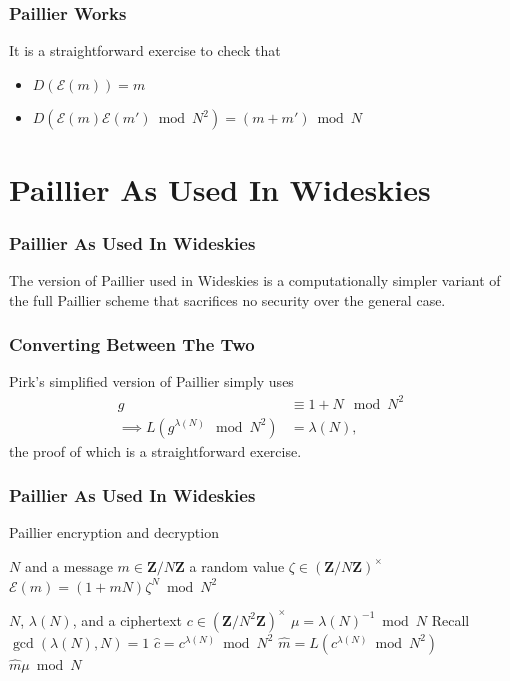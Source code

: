 \documentclass{beamer}
\makeatletter
\DeclareRobustCommand{\NAME}{Wideskies\xspace}
\newcommand{\Z}{\ensuremath{\mathbf{Z}}}
\newcommand{\zmodn}{\ensuremath{\Z/N\Z}}
\newcommand{\zmodntunits}{\ensuremath{\left(\Z/N^{2}\Z\right)^{\times}}}
\DeclareRobustCommand*{\&}{%
  \nfss@text{%
    \fontfamily{LinuxBiolinumT-TLF}%
    \selectfont
    \symbol{`\&}%
  }%
}
\makeatother
\begin{document}
\begin{frame}
\frametitle{Paillier Works}
  It is a straightforward exercise to check that 
  \begin{itemize}
    \item $D(\mathcal{E}(m)) = m$
    \item $D(\mathcal{E}(m)\mathcal{E}(m')\bmod N^2) = (m + m') \bmod N $
  \end{itemize}
\end{frame}

\section{Paillier As Used In \NAME}
\begin{frame}
\frametitle{Paillier As Used In \NAME}
The version of Paillier used in \NAME is a computationally simpler variant of the
full Paillier scheme that sacrifices no security over the general case.
\end{frame}

\begin{frame}
  \frametitle{Converting Between The Two}
  Pirk's simplified version of Paillier simply uses
  \begin{align*}
    g &\equiv 1 + N \mod N^2\\
    \implies L(g^{\lambda(N)} \mod N^2) &= \lambda(N),
  \end{align*}
  the proof of which is a straightforward exercise.
\end{frame}

\begin{frame}
\frametitle{Paillier As Used In \NAME}
\begin{algorithm}[H]
  \caption{Paillier encryption and decryption}\label{alg.paillier_encrypt}
  \begin{algorithmic}[1]
    \State \Given \(N\) and a message \(m\in\zmodn\)
    \State \Select a random value \(\zeta\in \left(\zmodn\right)^{\times}\)
    \State \Return \(\mathcal{E}(m) = (1+mN)\zeta^{N}\bmod{N^{2}}\)
    \EndProcedure
  \end{algorithmic}

  \begin{algorithmic}[1]
    \State \Given \(N\), \(\lambda(N)\), and a ciphertext \(c\in\zmodntunits\)
    \State \Set \(\mu = \lambda(N)^{-1}\bmod N\)
    \Comment Recall \(\gcd(\lambda(N), N) = 1\)
    \State \Set \(\hat{c} = c^{\lambda(N)}\bmod N^{2}\)
    \State\label{step.div}\Set \(\hat{m} = L(c^{\lambda(N)}\bmod N^{2})\)
    \State \Return \(\hat{m}\mu\bmod N\)
    \EndProcedure
  \end{algorithmic}
\end{algorithm}
\end{frame}
\end{document}
